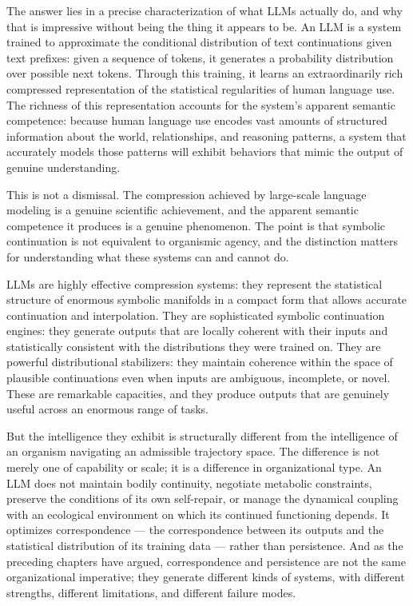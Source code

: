 \documentclass[12pt,a4paper]{report}
\theoremstyle{flyxion}
\begin{document}
The answer lies in a precise characterization of what LLMs actually do, and why that is impressive without being the thing it appears to be. An LLM is a system trained to approximate the conditional distribution of text continuations given text prefixes: given a sequence of tokens, it generates a probability distribution over possible next tokens. Through this training, it learns an extraordinarily rich compressed representation of the statistical regularities of human language use. The richness of this representation accounts for the system's apparent semantic competence: because human language use encodes vast amounts of structured information about the world, relationships, and reasoning patterns, a system that accurately models those patterns will exhibit behaviors that mimic the output of genuine understanding.

This is not a dismissal. The compression achieved by large-scale language modeling is a genuine scientific achievement, and the apparent semantic competence it produces is a genuine phenomenon. The point is that symbolic continuation is not equivalent to organismic agency, and the distinction matters for understanding what these systems can and cannot do.

LLMs are highly effective compression systems: they represent the statistical structure of enormous symbolic manifolds in a compact form that allows accurate continuation and interpolation. They are sophisticated symbolic continuation engines: they generate outputs that are locally coherent with their inputs and statistically consistent with the distributions they were trained on. They are powerful distributional stabilizers: they maintain coherence within the space of plausible continuations even when inputs are ambiguous, incomplete, or novel. These are remarkable capacities, and they produce outputs that are genuinely useful across an enormous range of tasks.

But the intelligence they exhibit is structurally different from the intelligence of an organism navigating an admissible trajectory space. The difference is not merely one of capability or scale; it is a difference in organizational type. An LLM does not maintain bodily continuity, negotiate metabolic constraints, preserve the conditions of its own self-repair, or manage the dynamical coupling with an ecological environment on which its continued functioning depends. It optimizes correspondence --- the correspondence between its outputs and the statistical distribution of its training data --- rather than persistence. And as the preceding chapters have argued, correspondence and persistence are not the same organizational imperative; they generate different kinds of systems, with different strengths, different limitations, and different failure modes.
\end{document}

